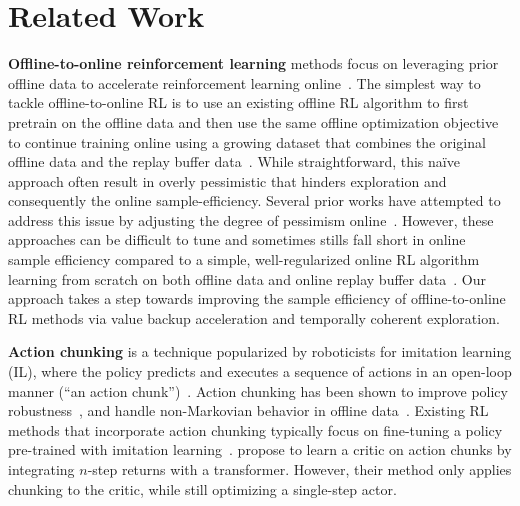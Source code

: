 \section{Related Work}
\label{sec:related}


\textbf{Offline-to-online reinforcement learning} methods focus on leveraging prior offline data to accelerate reinforcement learning online~\citep{xie2021policy, song2022hybrid, lee2022offline, NEURIPS2022_ba1c5356, zhang2023policy, zheng2023adaptive, ball2023efficient, nakamoto2024cal, zhou2024efficient, li2024accelerating}. The simplest way to tackle offline-to-online RL is to use an existing offline RL algorithm to first pretrain on the offline data and then use the same offline optimization objective to continue training online using a growing dataset that combines the original offline data and the replay buffer data~\citep{nair2020awac, kumar2020conservative, kostrikov2021offline, tarasov2024revisiting, park2025flow, agarwal2022reincarnating, luo2023finetuning, lee2022offline}. While straightforward, this na\"ive approach often result in overly pessimistic that hinders exploration and consequently the online sample-efficiency. Several prior works have attempted to address this issue by adjusting the degree of pessimism online~\citep{zhou2024efficient, nakamoto2024cal, luo2023finetuning, lee2022offline, wang2023train}. 
However, these approaches can be difficult to tune and sometimes stills fall short in online sample efficiency compared to a simple, well-regularized online RL algorithm learning from scratch on both offline data and online replay buffer data~\citep{ball2023efficient}.
Our approach takes a step towards improving the sample efficiency of offline-to-online RL methods via value backup acceleration and temporally coherent exploration.

\textbf{Action chunking} is a technique popularized by roboticists for imitation learning (IL), where the policy predicts and executes a sequence of actions in an  open-loop manner (``an action chunk'')~\citep{zhao2023learning}. Action chunking has been shown to improve policy robustness~\citep{zhao2023learning, george2023one, bharadhwaj2024roboagent}, and handle non-Markovian behavior in offline data~\citep{zhao2023learning}. 
Existing RL methods that incorporate action chunking typically focus on fine-tuning a policy pre-trained with imitation learning~\citep{ren2024diffusion, seo2024reinforcement}. \citet{tian2025chunking} propose to learn a critic on action chunks by integrating $n$-step returns with a transformer. However, their method only applies chunking to the critic, while still optimizing a single-step actor.

